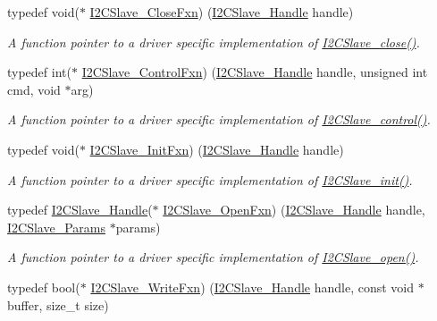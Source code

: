 \begin{DoxyCompactItemize}
typedef void($\ast$ \hyperlink{_i2_c_slave_8h_a9a2e6a8574316d6a494d208de4329fc7}{I2\+C\+Slave\+\_\+\+Close\+Fxn}) (\hyperlink{_i2_c_slave_8h_a302d775f802ff66ed2ca05e1956f738e}{I2\+C\+Slave\+\_\+\+Handle} handle)
\begin{DoxyCompactList}\small\item\em A function pointer to a driver specific implementation of \hyperlink{_i2_c_slave_8h_a323cbb394c10ab1018820c9a76eccc18}{I2\+C\+Slave\+\_\+close()}. \end{DoxyCompactList}\item 
typedef int($\ast$ \hyperlink{_i2_c_slave_8h_a895a9a94cd98b391cdd3d54ef62dd86a}{I2\+C\+Slave\+\_\+\+Control\+Fxn}) (\hyperlink{_i2_c_slave_8h_a302d775f802ff66ed2ca05e1956f738e}{I2\+C\+Slave\+\_\+\+Handle} handle, unsigned int cmd, void $\ast$arg)
\begin{DoxyCompactList}\small\item\em A function pointer to a driver specific implementation of \hyperlink{_i2_c_slave_8h_abcd38688f29738ee33b1748a42a3b140}{I2\+C\+Slave\+\_\+control()}. \end{DoxyCompactList}\item 
typedef void($\ast$ \hyperlink{_i2_c_slave_8h_ae821c2b97cf6640cd58b8e0c40efb464}{I2\+C\+Slave\+\_\+\+Init\+Fxn}) (\hyperlink{_i2_c_slave_8h_a302d775f802ff66ed2ca05e1956f738e}{I2\+C\+Slave\+\_\+\+Handle} handle)
\begin{DoxyCompactList}\small\item\em A function pointer to a driver specific implementation of \hyperlink{_i2_c_slave_8h_ad7518283a3f3fb80cefe6cb7ca7a4a36}{I2\+C\+Slave\+\_\+init()}. \end{DoxyCompactList}\item 
typedef \hyperlink{_i2_c_slave_8h_a302d775f802ff66ed2ca05e1956f738e}{I2\+C\+Slave\+\_\+\+Handle}($\ast$ \hyperlink{_i2_c_slave_8h_a7c6638bde6397024b1f1ece4f9baed37}{I2\+C\+Slave\+\_\+\+Open\+Fxn}) (\hyperlink{_i2_c_slave_8h_a302d775f802ff66ed2ca05e1956f738e}{I2\+C\+Slave\+\_\+\+Handle} handle, \hyperlink{struct_i2_c_slave___params}{I2\+C\+Slave\+\_\+\+Params} $\ast$params)
\begin{DoxyCompactList}\small\item\em A function pointer to a driver specific implementation of \hyperlink{_i2_c_slave_8h_abdfc770ace6accbf91b91f3e195e7119}{I2\+C\+Slave\+\_\+open()}. \end{DoxyCompactList}\item 
typedef bool($\ast$ \hyperlink{_i2_c_slave_8h_a7515207a9b0bde39ff2744ac3ed366ea}{I2\+C\+Slave\+\_\+\+Write\+Fxn}) (\hyperlink{_i2_c_slave_8h_a302d775f802ff66ed2ca05e1956f738e}{I2\+C\+Slave\+\_\+\+Handle} handle, const void $\ast$buffer, size\+\_\+t size)

\end{DoxyCompactItemize}
